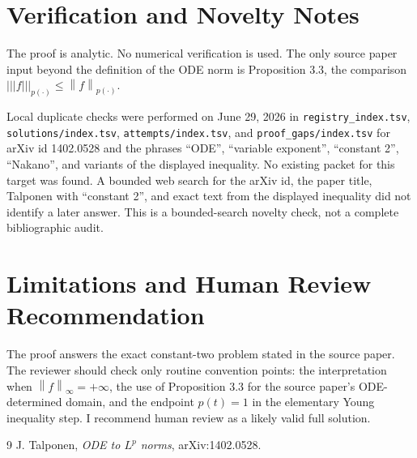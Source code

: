 \documentclass[11pt]{article}
\newcommand{\norm}[1]{\left\lVert #1 \right\rVert}
\begin{document}
\section*{Verification and Novelty Notes}

The proof is analytic.  No numerical verification is used.  The only source
paper input beyond the definition of the ODE norm is Proposition 3.3, the
comparison \(|||f|||_{p(\cdot)}\leq\norm{f}_{p(\cdot)}\).

Local duplicate checks were performed on June 29, 2026 in
\texttt{registry\_index.tsv}, \texttt{solutions/index.tsv},
\texttt{attempts/index.tsv}, and \texttt{proof\_gaps/index.tsv} for arXiv id
1402.0528 and the phrases ``ODE'', ``variable exponent'', ``constant 2'',
``Nakano'', and variants of the displayed inequality.  No existing packet for
this target was found.  A bounded web search for the arXiv id, the paper
title, Talponen with ``constant 2'', and exact text from the displayed
inequality did not identify a later answer.  This is a bounded-search novelty
check, not a complete bibliographic audit.

\section*{Limitations and Human Review Recommendation}

The proof answers the exact constant-two problem stated in the source paper.
The reviewer should check only routine convention points: the interpretation
when \(\norm{f}_\infty=+\infty\), the use of Proposition 3.3 for the source
paper's ODE-determined domain, and the endpoint \(p(t)=1\) in the elementary
Young inequality step.  I recommend human review as a likely valid full
solution.

\begin{thebibliography}{9}
J. Talponen, \emph{ODE to \(L^p\) norms}, arXiv:1402.0528.
\end{thebibliography}
\end{document}
